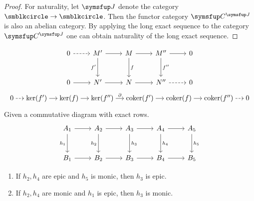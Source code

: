 \begin{proof}
  For naturality, let $\CAT{J}$ denote the category $\BCIR\to\BCIR$. Then the functor category $\CAT{C}^{\CAT{J}}$ is also an abelian category. By applying the long exact sequence to the category $\CAT{C}^{\CAT{J}}$ one can obtain naturality of the long exact sequence.
\end{proof}

\begin{lemma}
  \begin{equation*}
    \begin{tikzcd}[row sep=large]
      0 & M' & M & M'' & 0\\
      0 & N' & N & N'' & 0
      \arrow[from=1-1,dashed,]{1-2}[]{}
      \arrow[from=1-2,]{1-3}[]{}
      \arrow[from=1-3,]{1-4}[]{}
      \arrow[from=1-4,]{1-5}[]{}
      \arrow[from=2-1,]{2-2}[]{}
      \arrow[from=2-2,]{2-3}[]{}
      \arrow[from=2-3,]{2-4}[]{}
      \arrow[from=2-4,dashed,]{2-5}[]{}
      \arrow[from=1-2,]{2-2}[swap]{f'}
      \arrow[from=1-3,]{2-3}[]{f}
      \arrow[from=1-4,]{2-4}[]{f''}
    \end{tikzcd}
  \end{equation*}
  \begin{equation*}
    \begin{tikzcd}[sep=small, cramped]
      0 & \KER(f') & \KER(f) & \KER(f'') & \COKER(f') & \COKER(f) & \COKER(f'') & 0
      \arrow[from=1-1,dashed,]{1-2}[]{}
      \arrow[from=1-2,]{1-3}[]{}
      \arrow[from=1-3,]{1-4}[]{}
      \arrow[from=1-4,]{1-5}[]{\partial}
      \arrow[from=1-5,]{1-6}[]{}
      \arrow[from=1-6,]{1-7}[]{}
      \arrow[from=1-7,dashed,]{1-8}[]{}
    \end{tikzcd}
  \end{equation*}
\end{lemma}

\begin{lemma}
  Given a commutative diagram with exact rows.
  \begin{equation*}
    \begin{tikzcd}[row sep=large]
      A_1 & A_2 & A_3 & A_4 & A_5\\
      B_1 & B_2 & B_3 & B_4 & B_5
      \arrow[from=1-1,]{1-2}[]{}
      \arrow[from=1-2,]{1-3}[]{}
      \arrow[from=1-3,]{1-4}[]{}
      \arrow[from=1-4,]{1-5}[]{}
      \arrow[from=2-1,]{2-2}[]{}
      \arrow[from=2-2,]{2-3}[]{}
      \arrow[from=2-3,]{2-4}[]{}
      \arrow[from=2-4,]{2-5}[]{}
      \arrow[from=1-1,]{2-1}[swap]{h_1}
      \arrow[from=1-2,]{2-2}[swap]{h_2}
      \arrow[from=1-3,]{2-3}[]{h_3}
      \arrow[from=1-4,]{2-4}[]{h_4}
      \arrow[from=1-5,]{2-5}[]{h_5}
    \end{tikzcd}
  \end{equation*}
  \begin{enumerate}
    \item If $h_2, h_4$ are epic and $h_5$ is monic, then $h_3$ is epic.
    \item If $h_2, h_4$ are monic and $h_1$ is epic, then $h_3$ is monic.
  \end{enumerate}
\end{lemma}

